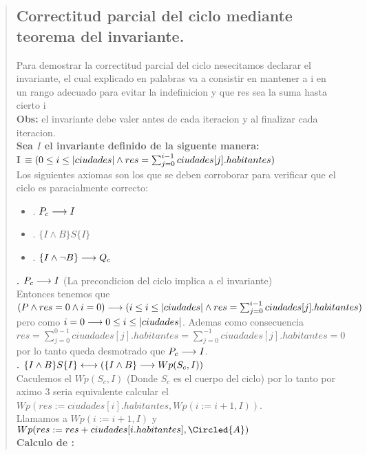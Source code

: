 \documentclass[10pt,a4paper]{article}
\begin{document}
\begin{quote}
 \subsection{Correctitud parcial del ciclo mediante teorema del invariante.}
 Para demostrar la correctitud parcial del ciclo nesecitamos declarar el invariante, el cual explicado en palabras va a consistir en mantener a i en un rango adecuado para evitar la indefinicion y que res sea la suma hasta cierto i \\ [0.2cm]
 \textbf{Obs:} el invariante debe valer antes de cada iteracion y al finalizar cada iteracion.\\ [0.2cm] 
 \textbf{Sea \(I\) el invariante definido de la siguente manera:} \\ [0.1cm]
 \textbf{I} $\equiv(0 \leq i \leq |ciudades| \land res = \sum_{j=0}^{i-1}ciudades[j].habitantes)$ \\ [0.2cm] 
 Los siguientes axiomas son los que se deben corroborar para verificar que el ciclo es paracialmente correcto:
\begin{itemize}
 \item {}. $P_c \longrightarrow I$
 \item {}. $\{I \land B\} S \{I\}$
 \item {}. $\{I \land \neg B\} \longrightarrow Q_c$
 \end{itemize}
 \textbf{. $P_c \longrightarrow I$} (La precondicion del ciclo implica a el invariante) \\ [0.1cm]
 Entonces tenemos que $(P \land res = 0 \land i = 0) \longrightarrow (i \leq i \leq |ciudades| \land res = \sum_{j=0}^{i-1}ciudades[j].habitantes)$ pero como $i = 0 \longrightarrow 0 \leq i \leq |ciudades|$. Ademas como consecuencia $res = \sum_{j=0}^{0-1}ciuadades[j].habitantes = \sum_{j=0}^{-1}ciuadades[j].habitantes = 0$ por lo tanto queda desmotrado que $P_c \longrightarrow I$. \\ [0.2cm]
 \textbf{. $\{I \land B\} S \{I\} \longleftrightarrow (\{I \land B\} \longrightarrow Wp(S_c,I))$  } \\ [0.2cm]
 Caculemos el $Wp(S_c,I)$ (Donde $S_c$ es el cuerpo del ciclo) por lo tanto por aximo 3 seria equivalente calcular el $Wp(res := ciudades[i].habitantes, Wp(i := i + 1, I))$. \\
 Llamamos  a $Wp(i := i + 1, I)$ y  $Wp(res := res + ciudades[i.habitantes], \Circled{A})$ \\ [0.1cm]
 \textbf {Calculo de :} \\ [0.1cm]

\end{quote}
\end{document}
